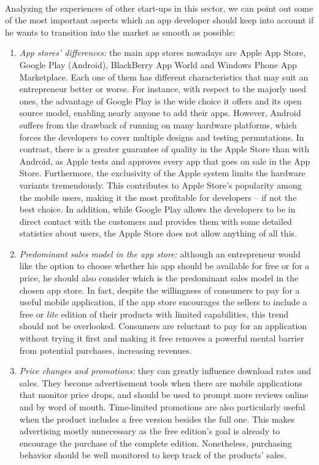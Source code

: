 \documentclass[twoside]{report}
\begin{document}
\paragraph{}
Analyzing the experiences of other start-ups in this sector, we can point out some of the most important aspects which an app developer should keep into account if he wants to transition into the market as smooth as possible:
\begin{enumerate}
\item \emph{App stores' differences:} the main app stores nowadays are Apple App Store, Google Play (Android), BlackBerry App World and Windows Phone App Marketplace. Each one of them has different characteristics that may suit an entrepreneur better or worse. For instance, with respect to the majorly used ones, the advantage of Google Play is the wide choice it offers and its open source model, enabling nearly anyone to add their apps. However, Android suffers from the drawback of running on many hardware platforms, which forces the developers to cover multiple designs and testing permutations. In contrast, there is a greater guarantee of quality in the Apple Store than with Android, as Apple tests and approves every app that goes on sale in the App Store. Furthermore, the exclusivity of the Apple system limits the hardware variants tremendously. This contributes to Apple Store's popularity among the mobile users, making it the most profitable for developers – if not the best choice. In addition, while Google Play allows the developers to be in direct contact with the customers and provides them with some detailed statistics about users, the Apple Store does not allow anything of all this.
\item \emph{Predominant sales model in the app store:} although an entrepreneur would like the option to choose whether his app should be available for free or for a price, he should also consider which is the predominant sales model in the chosen app store. In fact, despite the willingness of consumers to pay for a useful mobile application, if the app store encourages the sellers to include a free or \emph{lite} edition of their products with limited capabilities, this trend should not be overlooked. Consumers are reluctant to pay for an application without trying it first and making it free removes a powerful mental barrier from potential purchases, increasing revenues.
\item \emph{Price changes and promotions:} they can greatly influence download rates and sales. They become advertisement tools when there are mobile applications that monitor price drops, and should be used to prompt more reviews online and by word of mouth. Time-limited promotions are also particularly useful when the product includes a free version besides the full one. This makes advertising mostly unnecessary as the free edition's goal is already to encourage the purchase of the complete edition. Nonetheless, purchasing behavior should be well monitored to keep track of the products' sales.

\end{enumerate}
\end{document}
